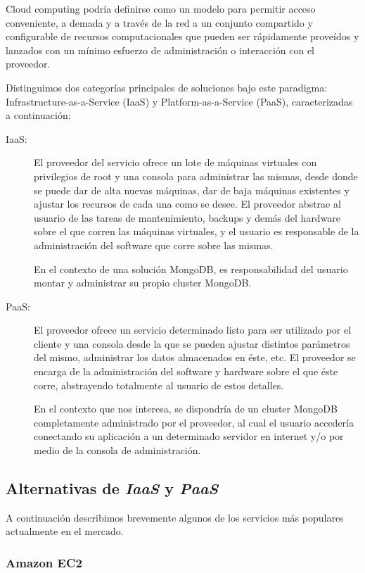 \documentclass[a4paper,10pt,twoside]{article}
\begin{document}
Cloud computing podría definirse como un modelo para permitir acceso conveniente, a demada y a través de la red a un conjunto compartido y configurable de recursos computacionales que pueden ser rápidamente proveídos y lanzados con un mínimo esfuerzo de administración o interacción con el proveedor.

Distinguimos dos categorías principales de soluciones bajo este paradigma: Infrastructure-as-a-Service (IaaS) y Platform-as-a-Service (PaaS), caracterizadas a continuación:

\begin{description}
	\item[IaaS:] El proveedor del servicio ofrece un lote de máquinas virtuales con privilegios de root y una consola para administrar las mismas, desde donde se puede dar de alta nuevas máquinas, dar de baja máquinas existentes y ajustar los recursos de cada una como se desee. El proveedor abstrae al usuario de las tareas de mantenimiento, backups y demás del hardware sobre el que corren las máquinas virtuales, y el usuario es responsable de la administración del software que corre sobre las mismas.
	
	En el contexto de una solución MongoDB, es responsabilidad del usuario montar y administrar su propio cluster MongoDB.

	\item[PaaS:] El proveedor ofrece un servicio determinado listo para ser utilizado por el cliente y una consola desde la que se pueden ajustar distintos parámetros del mismo, administrar los datos almacenados en éste, etc. El proveedor se encarga de la administración del software y hardware sobre el que éste corre, abstrayendo totalmente al usuario de estos detalles.

	En el contexto que nos interesa, se dispondría de un cluster MongoDB completamente administrado por el proveedor, al cual el usuario accedería conectando su aplicación a un determinado servidor en internet y/o por medio de la consola de administración.
\end{description}


\subsection{Alternativas de \emph{IaaS} y \emph{PaaS}}

A continuación describimos brevemente algunos de los servicios más populares actualmente en el mercado.


\subsubsection{Amazon EC2}
\end{document}
